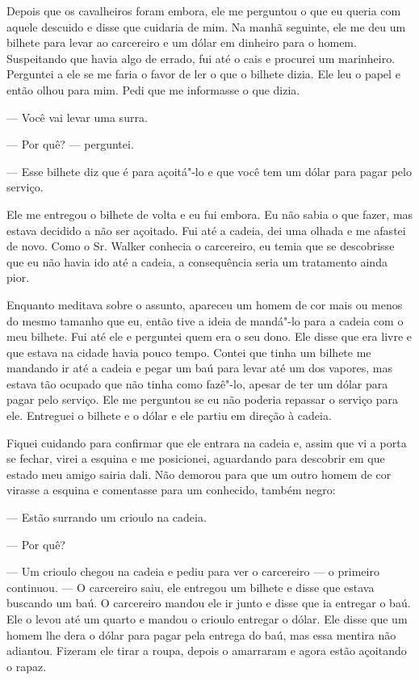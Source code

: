 Depois que os cavalheiros foram embora, ele me perguntou o que eu queria
com aquele descuido e disse que cuidaria de mim. Na manhã seguinte, ele
me deu um bilhete para levar ao carcereiro e um dólar em dinheiro para o
homem. Suspeitando que havia algo de errado, fui até o cais e procurei
um marinheiro. Perguntei a ele se me faria o favor de ler o que o
bilhete dizia. Ele leu o papel e então olhou para mim. Pedi que me
informasse o que dizia.

--- Você vai levar uma surra.

--- Por quê? --- perguntei.

--- Esse bilhete diz que é para açoitá"-lo e que você tem um dólar para
pagar pelo serviço.

Ele me entregou o bilhete de volta e eu fui embora. Eu não sabia o que
fazer, mas estava decidido a não ser açoitado. Fui até a cadeia, dei uma
olhada e me afastei de novo. Como o Sr. Walker conhecia o carcereiro, eu
temia que se descobrisse que eu não havia ido até a cadeia, a
consequência seria um tratamento ainda pior.

Enquanto meditava sobre o assunto, apareceu um homem de cor mais ou
menos do mesmo tamanho que eu, então tive a ideia de mandá"-lo para a
cadeia com o meu bilhete. Fui até ele e perguntei quem era o seu dono.
Ele disse que era livre e que estava na cidade havia pouco tempo. Contei
que tinha um bilhete me mandando ir até a cadeia e pegar um baú para
levar até um dos vapores, mas estava tão ocupado que não tinha como
fazê"-lo, apesar de ter um dólar para pagar pelo serviço. Ele me
perguntou se eu não poderia repassar o serviço para ele. Entreguei o
bilhete e o dólar e ele partiu em direção à cadeia.

Fiquei cuidando para confirmar que ele entrara na cadeia e, assim que vi
a porta se fechar, virei a esquina e me posicionei, aguardando para
descobrir em que estado meu amigo sairia dali. Não demorou para que um
outro homem de cor virasse a esquina e comentasse para um conhecido,
também negro:

--- Estão surrando um crioulo na cadeia.

--- Por quê?

--- Um crioulo chegou na cadeia e pediu para ver o carcereiro --- o
primeiro continuou. --- O carcereiro saiu, ele entregou um bilhete e
disse que estava buscando um baú. O carcereiro mandou ele ir junto e
disse que ia entregar o baú. Ele o levou até um quarto e mandou o
crioulo entregar o dólar. Ele disse que um homem lhe dera o dólar para
pagar pela entrega do baú, mas essa mentira não adiantou. Fizeram ele
tirar a roupa, depois o amarraram e agora estão açoitando o rapaz.

